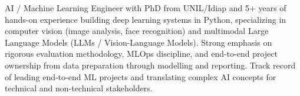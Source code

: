 


\begin{cvparagraph}
AI / Machine Learning Engineer with PhD from UNIL/Idiap and 5+ years of hands-on experience building deep learning systems in Python, specializing in computer vision (image analysis, face recognition) and multimodal Large Language Models (LLMs / Vision-Language Models). Strong emphasis on rigorous evaluation methodology, MLOps discipline, and end-to-end project ownership from data preparation through modelling and reporting. Track record of leading end-to-end ML projects and translating complex AI concepts for technical and non-technical stakeholders.
\end{cvparagraph}

